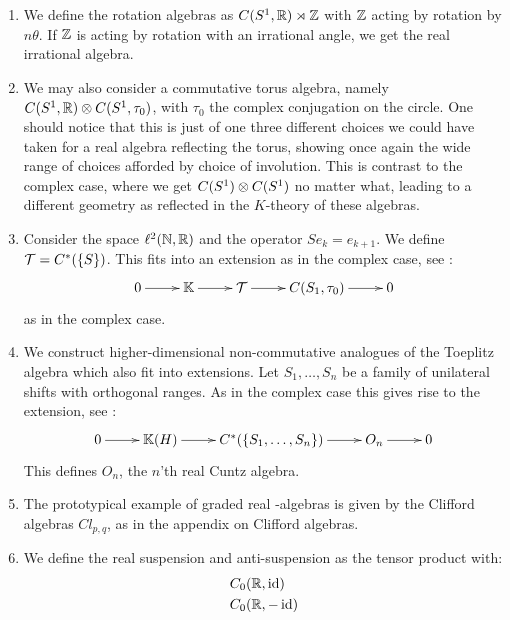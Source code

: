 \begin{example}
\begin{enumerate}
\item
	We define the rotation algebras as $C(S^1,\mathbb{R})\rtimes \mathbb{Z}$ with $\mathbb{Z}$ acting by rotation by $n\theta$. If $\mathbb{Z}$ is acting by rotation with an irrational angle, we get the real irrational algebra.%
\item	
We may also consider a commutative torus algebra, namely $C(S^1,\mathbb{R})\otimes C(S^1,\tau_0)$, with $\tau_0$ the complex conjugation on the circle. One should notice that this is just of one three different choices we could have taken for a real algebra reflecting the torus, showing once again the wide range of choices afforded by choice of involution. 	
	This is contrast to the complex case, where we get $C(S^1)\otimes C(S^1)$ no matter what, leading to a different geometry as reflected in the $K$-theory of these algebras. %
\item
	Consider the space $\ell^2(\mathbb{N},\mathbb{R})$ and the operator $Se_k=e_{k+1}$. We define $\mathcal{T}=C^*(\{S\})$. This fits into an extension as in the complex case, see \cite[Chapter 1]{schroder}:
	\begin{align*}
	\xymatrix{
		0\ar[r] & \K \ar[r] & \mathcal{T} \ar[r] & C(S_1,\tau_0) \ar[r] & 0
	}
	\end{align*}
	as in the complex case. 
\item
	We construct higher-dimensional non-commutative analogues of the Toeplitz algebra which also fit into extensions. Let $S_1,\dots,S_n$ be a family of unilateral shifts with orthogonal ranges. As in the complex case this gives rise to the extension, see \cite[Chapter 1]{schroder}: 
	\begin{align*}
	\xymatrix{
		0\ar[r] & \K(H) \ar[r] & C^*(\{S_1,\dots,S_n\}) \ar[r]  & O_n \ar[r] & 0
		}
	\end{align*}
	This defines $O_n$, the $n$'th real Cuntz algebra. 
\item
	The prototypical example of graded real \Cstar-algebras is given by the Clifford algebras $Cl_{p,q}$, as in the appendix on Clifford algebras.
\item
	We define the real suspension and anti-suspension as the tensor product with:
	\begin{align*}
		&C_0(\mathbb{R},\operatorname{id}) \\
		&C_0(\mathbb{R},-\operatorname{id}) 
	\end{align*}
\end{enumerate}
\end{example}
